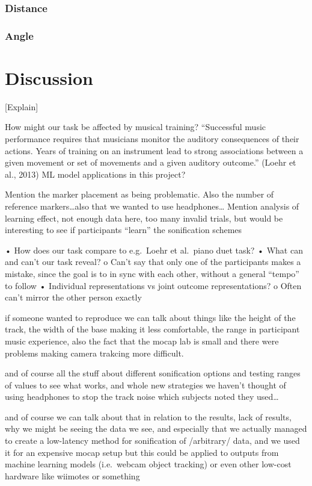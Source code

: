 \documentclass[10pt,a4paper,onecolumn]{article}
\begin{document}
\hypertarget{distance-1}{%
\subsubsection{Distance}\label{distance-1}}

\hypertarget{angle}{%
\subsubsection{Angle}\label{angle}}

\hypertarget{discussion}{%
\section{Discussion}\label{discussion}}

{[}Explain{]}

How might our task be affected by musical training? ``Successful music performance requires that musicians monitor the auditory consequences of their actions. Years of training on an instrument lead to strong associations between a given movement or set of movements and a given auditory outcome.'' (Loehr et al., 2013)
ML model applications in this project?

Mention the marker placement as being problematic. Also the number of reference markers\ldots also that we wanted to use headphones\ldots{}
Mention analysis of learning effect, not enough data here, too many invalid trials, but would be interesting to see if participants ``learn'' the sonification schemes

• How does our task compare to e.g.~Loehr et al.~piano duet task?
• What can and can't our task reveal?
o Can't say that only one of the participants makes a mistake, since the goal is to in sync with each other, without a general ``tempo'' to follow
• Individual representations vs joint outcome representations?
o Often can't mirror the other person exactly

if someone wanted to reproduce we can talk about things like the height of the track, the width of the base making it less comfortable, the range in participant music experience, also the fact that the mocap lab is small and there were problems making camera trakcing more difficult.

and of course all the stuff about different sonification options and testing ranges of values to see what works, and whole new strategies we haven't thought of using headphones to stop the track noise which subjects noted they used\ldots{}

and of course we can talk about that in relation to the results, lack of results, why we might be seeing the data we see,
and especially that we actually managed to create a low-latency method for sonification of /arbitrary/ data, and we used it for an expensive mocap setup but this could be applied to outputs from machine learning models (i.e.~webcam object tracking) or even other low-cost hardware like wiimotes or something
\balance
\clearpage


\printbibliography[title=References,heading=bibintoc]
\end{document}
